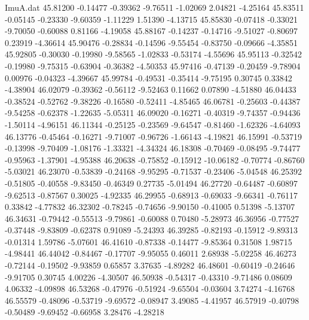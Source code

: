 \begin{filecontents}{ImuA.dat}
  45.81200   -0.14477   -0.39362   -9.76511   -1.02069    2.04821   -4.25164
  45.83511   -0.05145   -0.23330   -9.60359   -1.11229    1.51390   -4.13715
  45.85830   -0.07418   -0.33021   -9.70050   -0.60088    0.81166   -4.19058
  45.88167   -0.14237   -0.14716   -9.51027   -0.80697    0.23919   -4.36614
  45.90476   -0.28834   -0.14596   -9.55454   -0.83750   -0.09666   -4.35851
  45.92805   -0.30030   -0.19980   -9.58565   -1.02833   -0.53174   -4.55696
  45.95113   -0.32542   -0.19980   -9.75315   -0.63904   -0.36382   -4.50353
  45.97416   -0.47139   -0.20459   -9.78904    0.00976   -0.04323   -4.39667
  45.99784   -0.49531   -0.35414   -9.75195    0.30745    0.33842   -4.38904
  46.02079   -0.39362   -0.56112   -9.52463    0.11662    0.07890   -4.51880
  46.04433   -0.38524   -0.52762   -9.38226   -0.16580   -0.52411   -4.85465
  46.06781   -0.25603   -0.44387   -9.54258   -0.62378   -1.22635   -5.05311
  46.09020   -0.16271   -0.40319   -9.74357   -0.94436   -1.50114   -4.96151
  46.11344   -0.25125   -0.23569   -9.64547   -0.81460   -1.62326   -4.64093
  46.13776   -0.45464   -0.16271   -9.71007   -0.96726   -1.66143   -4.19821
  46.15991   -0.53719   -0.13998   -9.70409   -1.08176   -1.33321   -4.34324
  46.18308   -0.70469   -0.08495   -9.74477   -0.95963   -1.37901   -4.95388
  46.20638   -0.75852   -0.15912  -10.06182   -0.70774   -0.86760   -5.03021
  46.23070   -0.53839   -0.24168   -9.95295   -0.71537   -0.23406   -5.04548
  46.25392   -0.51805   -0.40558   -9.83450   -0.46349    0.27735   -5.01494
  46.27720   -0.64487   -0.60897   -9.62513   -0.87567    0.30025   -4.92335
  46.29955   -0.68913   -0.69033   -9.66341   -0.76117    0.33842   -4.77832
  46.32302   -0.78245   -0.74656   -9.90150   -0.41005    0.51398   -5.13707
  46.34631   -0.79442   -0.55513   -9.79861   -0.60088    0.70480   -5.28973
  46.36956   -0.77527   -0.37448   -9.83809   -0.62378    0.91089   -5.24393
  46.39285   -0.82193   -0.15912   -9.89313   -0.01314    1.59786   -5.07601
  46.41610   -0.87338   -0.14477   -9.85364    0.31508    1.98715   -4.98441
  46.44042   -0.84467   -0.17707   -9.95055    0.46011    2.68938   -5.02258
  46.46273   -0.72144   -0.19502   -9.93859    0.65857    3.37635   -4.89282
  46.48601   -0.60419   -0.24646   -9.91705    0.30745    4.00226   -4.30507
  46.50938   -0.54317   -0.43310   -9.71486    0.08609    4.06332   -4.09898
  46.53268   -0.47976   -0.51924   -9.65504   -0.03604    3.74274   -4.16768
  46.55579   -0.48096   -0.53719   -9.69572   -0.08947    3.49085   -4.41957
  46.57919   -0.40798   -0.50489   -9.69452   -0.66958    3.28476   -4.28218

\end{filecontents}
